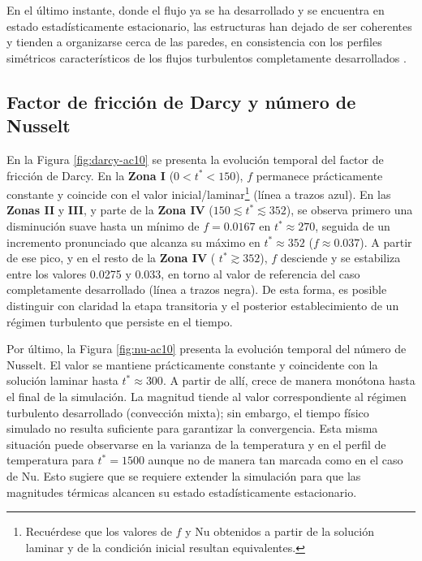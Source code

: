 En el último instante, donde el flujo ya se ha desarrollado y se encuentra en estado estadísticamente estacionario, las estructuras han dejado de ser coherentes y tienden a organizarse cerca de las paredes, en consistencia con los perfiles simétricos característicos de los flujos turbulentos completamente desarrollados \cite{machaca2024}.

\subsection{Factor de fricción de Darcy y número de Nusselt}
En la Figura \ref{fig:darcy-ac10} se presenta la evolución temporal del factor de fricción de Darcy. En la \textbf{Zona I} ($0 < t^* < 150$), $f$ permanece prácticamente constante y coincide con el \linebreak valor inicial/laminar\footnote{Recuérdese que los valores de $f$ y Nu obtenidos a partir de la solución laminar y de la condición inicial resultan equivalentes.} (línea a trazos azul). En las \textbf{Zonas II} y \textbf{III}, y parte de la \textbf{Zona IV} ($150 \lesssim t^* \lesssim 352 $), se observa primero una disminución suave hasta un mínimo de $f=0\text{.}0167$ en $t^*\approx270$, seguida de un incremento pronunciado que alcanza su máximo en $t^*\approx352$ ($f \approx 0\text{.}037$). A partir de ese pico, y en el resto de la \textbf{Zona IV} ( $t^*\gtrsim352$), $f$ desciende y se estabiliza entre los valores 0.0275 y 0.033, en torno al valor de referencia del caso completamente desarrollado (línea a trazos negra). De esta forma, es posible distinguir con claridad la etapa transitoria y el posterior establecimiento de un régimen turbulento que persiste en el tiempo.

Por último, la Figura \ref{fig:nu-ac10} presenta la evolución temporal del número de Nusselt. El valor se mantiene prácticamente constante y coincidente con la solución laminar hasta $t^* \approx 300$. A partir de allí, crece de manera monótona hasta el final de la simulación. La magnitud tiende al valor correspondiente al régimen turbulento desarrollado (convección mixta); sin embargo, el tiempo físico simulado no resulta suficiente para garantizar la convergencia. Esta misma situación puede observarse en la varianza de la temperatura y en el perfil de temperatura para $t^*=1500$ aunque no de manera tan marcada como en el caso de Nu. Esto sugiere \linebreak que se requiere extender la simulación para que las magnitudes térmicas alcancen su estado estadísticamente estacionario.




